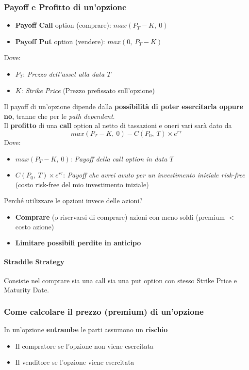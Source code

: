 \documentclass[12pt]{article}
\begin{document}
\subsubsection{Payoff e Profitto di un'opzione}
\begin{itemize}
    \item \textbf{Payoff Call} option (comprare): $max(P_T - K,\ 0)$
    \item \textbf{Payoff Put} option (vendere): $max(0,\ P_T - K)$
\end{itemize}
Dove:
\begin{itemize}[label=]
    \item $P_T$: \textit{Prezzo dell'asset alla data $T$}
    \item $K$: \textit{Strike Price} (Prezzo prefissato sull'opzione)
\end{itemize}
Il payoff di un'opzione dipende dalla \textbf{possibilità di poter esercitarla oppure no}, tranne che per le \textit{path dependent}.\\
Il \textbf{profitto} di una \textbf{call} option al netto di tassazioni e oneri vari sarà dato da
$$max(P_T - K,\ 0) - C(P_0, \ T)\times e^{r\tau}$$
Dove:
\begin{itemize}[label=]
    \item $max(P_T - K,\ 0)$: \textit{Payoff della call option in data $T$}
    \item $C(P_0, \ T)\times e^{r\tau}$: \textit{Payoff che avrei avuto per un investimento iniziale risk-free} (costo risk-free del mio investimento iniziale)
\end{itemize}
Perché utilizzare le opzioni invece delle azioni?
\begin{itemize}
    \item \textbf{Comprare} (o riservarsi di comprare) azioni con meno soldi (premium $<$ costo azione)
    \item \textbf{Limitare possibili perdite in anticipo}
\end{itemize}
\paragraph{Straddle Strategy} Consiste nel comprare sia una call sia una put option con stesso Strike Price e Maturity Date.
\subsubsection{Come calcolare il prezzo (premium) di un'opzione}
In un'opzione \textbf{entrambe} le parti assumono un \textbf{rischio}
\begin{itemize}
    \item Il compratore se l'opzione non viene esercitata
    \item Il venditore se l'opzione viene esercitata
\end{itemize}
\end{document}
